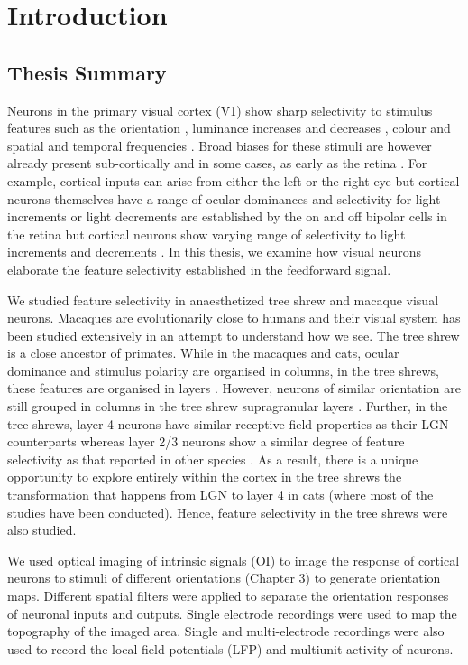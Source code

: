\chapter{Introduction}
\section{Thesis Summary}
Neurons in the primary visual cortex (V1) show sharp selectivity to
stimulus features such as the orientation \cite{Hubel1962d}, luminance increases and
decreases \cite{Jin2011a}, colour \cite{Hanazawa2000}and spatial and temporal frequencies \cite{Movshon1978}. Broad biases for
these stimuli are however already present sub-cortically and in some
cases, as early as the retina \cite{Bowmaker1980, Levick1980, Levick1982c, Vidyasagar1982, Passaglia2002a, Smith1990b}. For example, cortical inputs can arise
from either the left or the right eye but cortical neurons themselves
have a range of ocular dominances \cite{Hubel1962d} and selectivity for light increments
or light decrements are established by the on and off bipolar cells in
the retina \cite{Kuffler1951} but cortical neurons show varying range of selectivity to
light increments and decrements \cite{Jin2011a}. In this thesis, we examine how visual
neurons elaborate the feature selectivity established in the feedforward
signal.

We studied feature selectivity in anaesthetized tree shrew and macaque
visual neurons. Macaques are evolutionarily close to humans and their
visual system has been studied extensively in an attempt to understand
how we see. The tree shrew is a close ancestor of primates. While in the
macaques and cats, ocular dominance and stimulus polarity are organised
in columns, in the tree shrews, these features are organised in layers \cite{Conley1984}.
However, neurons of similar orientation are still grouped in columns in
the tree shrew supragranular layers \cite{Bosking1997}. Further, in the tree shrews, layer
4 neurons have similar receptive field properties as their LGN
counterparts whereas layer 2/3 neurons show a similar degree of feature
selectivity as that reported in other species \cite{Chisum2003c, VanHooser2013e}. As a result, there is a
unique opportunity to explore entirely within the cortex in the tree
shrews the transformation that happens from LGN to layer 4 in cats
(where most of the studies have been conducted). Hence, feature
selectivity in the tree shrews were also studied.

We used optical imaging of intrinsic signals (OI) to image the response
of cortical neurons to stimuli of different orientations (Chapter 3) to
generate orientation maps. Different spatial filters were applied to
separate the orientation responses of neuronal inputs and outputs.
Single electrode recordings were used to map the topography of the
imaged area. Single and multi-electrode recordings were also used to
record the local field potentials (LFP) and multiunit activity of
neurons.

